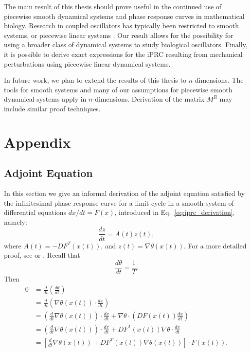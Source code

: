 \documentclass[12pt]{article}
\begin{document}
The main result of this thesis should prove useful in the continued use of piecewise smooth dynamical systems and phase response curves in mathematical biology.  Research in coupled oscillators has typically been restricted to smooth systems, or piecewise linear systems \cite{Coombes:2008:SIADS}.  Our result allows for the possibility for using a broader class of dynamical systems to study biological oscillators.  Finally, it is possible to derive exact expressions for the iPRC resulting from mechanical perturbations using piecewise linear dynamical systems.

In future work, we plan to extend the results of this thesis to $n$ dimensions.  The tools for smooth systems and many of our assumptions for piecewise smooth dynamical systems apply in $n$-dimensions.  Derivation of the matrix $M^R$ may include similar proof techniques.

\newpage
\appendix

\section{Appendix}
\subsection{Adjoint Equation}\label{app:adjoint_eq}
In this section we give an informal derivation of the adjoint equation satisfied by the infinitesimal phase response curve for a limit cycle in a smooth system of differential equations $dx/dt=F(x)$, introduced in Eq.~\eqref{eq:iprc_derivation}, namely:
\begin{equation}
 \frac{dz}{dt} = A(t) z(t),
\end{equation}
where $A(t) = -DF^T(x(t))$, and $z(t)=\nabla\theta(x(t))$.  For a more detailed proof, see \cite{BrownMoehlisHolmes:2004:NeComp}  or \cite{ErmentroutTerman2010book}.  Recall that
\begin{equation}
 \frac{d\theta}{dt} = \frac{1}{T}.
\end{equation}
Then
\begin{equation}\label{eq:adjoint-derivation}
\begin{split}
 0 &= \frac{d}{dt}\left(\frac{d\theta}{dt} \right)\\
 &=\frac{d}{dt}\left(\nabla\theta(x(t)) \cdot \frac{dx}{dt} \right)\\
 &=\left(\frac{d}{dt}\nabla\theta(x(t))\right) \cdot \frac{dx}{dt} + \nabla\theta\cdot\left(DF(x(t)) \frac{dx}{dt}\right)\\
 &=\left(\frac{d}{dt}\nabla\theta(x(t))\right) \cdot \frac{dx}{dt} + DF^T(x(t)) \nabla\theta \cdot \frac{dx}{dt}\\
 &=\left [ \frac{d}{dt} \nabla \theta(x(t)) + DF^T(x(t)) \nabla\theta(x(t)) \right ] \cdot F(x(t)).
\end{split}
\end{equation}
\end{document}
